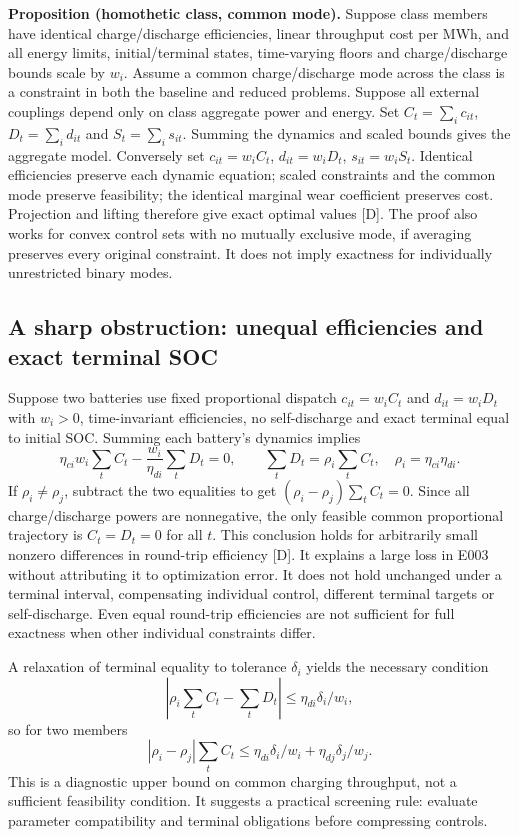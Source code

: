\documentclass[11pt,letterpaper]{article}
\begin{document}
\textbf{Proposition (homothetic class, common mode).} Suppose class members have identical charge/discharge efficiencies, linear throughput cost per MWh, and all energy limits, initial/terminal states, time-varying floors and charge/discharge bounds scale by $w_i$. Assume a common charge/discharge mode across the class is a constraint in both the baseline and reduced problems. Suppose all external couplings depend only on class aggregate power and energy. Set $C_t=\sum_i c_{it}$, $D_t=\sum_i d_{it}$ and $S_t=\sum_i s_{it}$. Summing the dynamics and scaled bounds gives the aggregate model. Conversely set $c_{it}=w_i C_t$, $d_{it}=w_i D_t$, $s_{it}=w_iS_t$. Identical efficiencies preserve each dynamic equation; scaled constraints and the common mode preserve feasibility; the identical marginal wear coefficient preserves cost. Projection and lifting therefore give exact optimal values [D]. The proof also works for convex control sets with no mutually exclusive mode, if averaging preserves every original constraint. It does not imply exactness for individually unrestricted binary modes.

\subsection{A sharp obstruction: unequal efficiencies and exact terminal SOC}
\label{sec:obstruction}
Suppose two batteries use fixed proportional dispatch $c_{it}=w_i C_t$ and $d_{it}=w_i D_t$ with $w_i>0$, time-invariant efficiencies, no self-discharge and exact terminal equal to initial SOC. Summing each battery's dynamics implies
\[
\eta_{ci}w_i\sum_t C_t -\frac{w_i}{\eta_{di}}\sum_t D_t=0,
\qquad
\sum_tD_t=\rho_i\sum_tC_t,\quad \rho_i=\eta_{ci}\eta_{di}.
\]
If $\rho_i\ne\rho_j$, subtract the two equalities to get $(\rho_i-\rho_j)\sum_tC_t=0$. Since all charge/discharge powers are nonnegative, the only feasible common proportional trajectory is $C_t=D_t=0$ for all $t$. This conclusion holds for arbitrarily small nonzero differences in round-trip efficiency [D]. It explains a large loss in E003 without attributing it to optimization error. It does not hold unchanged under a terminal interval, compensating individual control, different terminal targets or self-discharge. Even equal round-trip efficiencies are not sufficient for full exactness when other individual constraints differ.

A relaxation of terminal equality to tolerance $\delta_i$ yields the necessary condition
\[
|\rho_i\textstyle\sum_t C_t-\sum_t D_t|\le \eta_{di}\delta_i/w_i,
\]
so for two members
\[
|\rho_i-\rho_j|\sum_tC_t\le\eta_{di}\delta_i/w_i+\eta_{dj}\delta_j/w_j.
\]
This is a diagnostic upper bound on common charging throughput, not a sufficient feasibility condition. It suggests a practical screening rule: evaluate parameter compatibility and terminal obligations before compressing controls.
\end{document}
